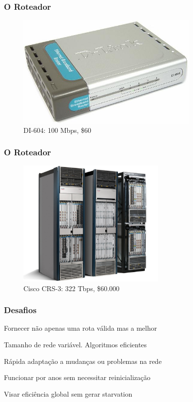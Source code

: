 \documentclass{beamer}
\begin{document}
\begin{frame}
\frametitle{O Roteador}
\begin{figure}[htp]
\begin{center}
  \includegraphics[width=90mm]{Imagens/D-Link.jpg}
  \caption[dlink]{DI-604: 100 Mbps, \$60}
  \label{dlink}
\end{center}
\end{figure}
\end{frame}

\begin{frame}
\frametitle{O Roteador}
\begin{figure}[htp]
\begin{center}
  \includegraphics[width=73mm]{Imagens/Cisco-CRS-3.jpeg}
  \caption[cisco]{Cisco CRS-3: 322 Tbps, \$60.000}
  \label{cisco}
\end{center}
\end{figure}
\end{frame}

\begin{frame}
\frametitle{Desafios}
\begin{description}
  \setlength{\itemsep}{0.7cm}%
  \item[Correção] Fornecer não apenas uma rota válida mas a melhor
  \item[Escalabilidade] Tamanho de rede variável. Algoritmos
  eficientes
  \item[Estabilidade] Rápida adaptação a mudanças ou problemas na rede
  \item[Robustez] Funcionar por anos sem necessitar reinicialização
  \item[Justiça] Visar eficiência global sem gerar starvation
\end{description}

\end{frame}
\end{document}
